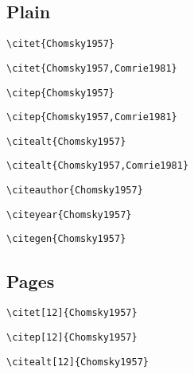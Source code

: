 \subsection{Plain}
 
\bigskip
\verb+\citet{Chomsky1957}+

        \citet{Chomsky1957}            


\bigskip
\verb+\citet{Chomsky1957,Comrie1981}+

       \citet{Chomsky1957,Comrie1981} 


\bigskip
\verb+\citep{Chomsky1957}+

       \citep{Chomsky1957}            


\bigskip
\verb+\citep{Chomsky1957,Comrie1981}+

      \citep{Chomsky1957,Comrie1981} 


\bigskip
\verb+\citealt{Chomsky1957}+

     \citealt{Chomsky1957}          


\bigskip
\verb+\citealt{Chomsky1957,Comrie1981}+

    \citealt{Chomsky1957,Comrie1981}


\bigskip
\verb+\citeauthor{Chomsky1957}+

   \citeauthor{Chomsky1957}         

  


\bigskip
\verb+\citeyear{Chomsky1957}+

   \citeyear{Chomsky1957}          

  

\bigskip
\verb+\citegen{Chomsky1957}+


   

 \subsection{Pages}
 
\bigskip
\verb+\citet[12]{Chomsky1957}+

        \citet[12]{Chomsky1957}            

 


\bigskip
\verb+\citep[12]{Chomsky1957}+

       \citep[12]{Chomsky1957}            

 


\bigskip
\verb+\citealt[12]{Chomsky1957}+

     \citealt[12]{Chomsky1957}          


